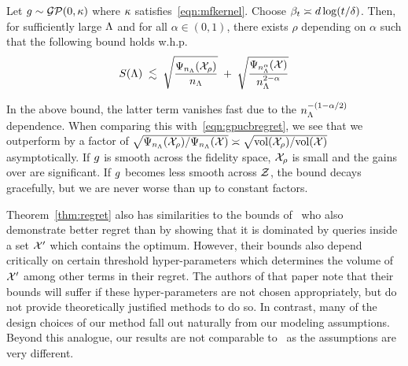 \begin{theorem}
\label{thm:regret}
Let $g\sim\mathcal{G}\mathcal{P}(0,\kappa)$ where $\kappa$ satisfies~\eqref{eqn:mfkernel}.
Choose $\beta_t \asymp d\log(t/\delta)$.
Then, for sufficiently large $\Lambda$ and for all $\alpha \in(0,1)$, there exists $\rho$
depending on $\alpha$ such that the following bound holds w.h.p.
\[
S(\Lambda) \;\lesssim\;
  \sqrt{\frac{\Psi_{n_\Lambda}(\mathcal{X}_\rho)}{n_\Lambda}}
  \;+\;
  \sqrt{\frac{\Psi_{n_\Lambda^\alpha}(\mathcal{X})}{n_\Lambda^{2-\alpha}}}
\]
\end{theorem}
In the above bound, the latter term vanishes fast due to the $n_\Lambda^{-(1-\alpha/2)}$
dependence.
When comparing this with~\eqref{eqn:gpucbregret},
we see that we outperform \gpucbs by a factor of
$\sqrt{\Psi_{n_\Lambda}(\mathcal{X}_\rho)/\Psi_{n_\Lambda}(\mathcal{X})} \asymp \sqrt{{\bf{\rm vol}}(\mathcal{X}_\rho)/{\bf{\rm vol}}(\mathcal{X})}$
asymptotically.
If $g$ is smooth across the fidelity space, $\mathcal{X}_\rho$ is small and
the gains over \gpucbs are significant.
If $g$ becomes less smooth across $\mathcal{Z}$, the bound decays gracefully, but
we are never worse than \gpucbs up to constant factors.

Theorem~\ref{thm:regret} also has similarities to the bounds 
of~\citet{kandasamy16mfbo} who also demonstrate better regret than \gpucbs by
showing that it is dominated by queries inside a set $\mathcal{X}'$ which contains the optimum.
However, their bounds also depend critically on certain threshold hyper-parameters
which determines the volume of $\mathcal{X}'$ among other  terms in their regret.
The authors of that paper note that their bounds will suffer if these hyper-parameters are not
chosen appropriately, but do not provide theoretically justified methods to do so.
In contrast, many of the design choices of our method fall out naturally from
our modeling assumptions.
Beyond this analogue, our results are not comparable to~\citet{kandasamy16mfbo}
as the assumptions are very different.

